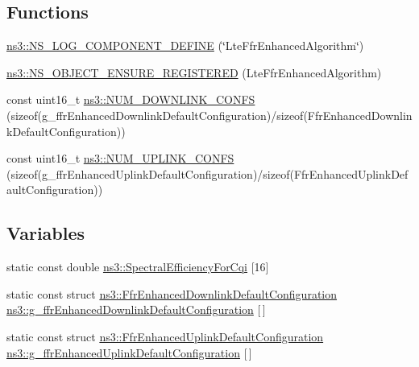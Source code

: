 \subsection*{Functions}
\begin{DoxyCompactItemize}
\item 
\hyperlink{namespacens3_a0186f2dcbc0b11c9d72410983a55bb59}{ns3\+::\+N\+S\+\_\+\+L\+O\+G\+\_\+\+C\+O\+M\+P\+O\+N\+E\+N\+T\+\_\+\+D\+E\+F\+I\+NE} (\char`\"{}Lte\+Ffr\+Enhanced\+Algorithm\char`\"{})
\item 
\hyperlink{namespacens3_a7b167836c469948d79c4d2b4accbaf0a}{ns3\+::\+N\+S\+\_\+\+O\+B\+J\+E\+C\+T\+\_\+\+E\+N\+S\+U\+R\+E\+\_\+\+R\+E\+G\+I\+S\+T\+E\+R\+ED} (Lte\+Ffr\+Enhanced\+Algorithm)
\item 
const uint16\+\_\+t \hyperlink{namespacens3_a417f8ac741bc7d3d00afe1cc14a59faf}{ns3\+::\+N\+U\+M\+\_\+\+D\+O\+W\+N\+L\+I\+N\+K\+\_\+\+C\+O\+N\+FS} (sizeof(g\+\_\+ffr\+Enhanced\+Downlink\+Default\+Configuration)/sizeof(Ffr\+Enhanced\+Downlink\+Default\+Configuration))
\item 
const uint16\+\_\+t \hyperlink{namespacens3_a5dc0a36a47c74fa76aa6f2db243f9478}{ns3\+::\+N\+U\+M\+\_\+\+U\+P\+L\+I\+N\+K\+\_\+\+C\+O\+N\+FS} (sizeof(g\+\_\+ffr\+Enhanced\+Uplink\+Default\+Configuration)/sizeof(Ffr\+Enhanced\+Uplink\+Default\+Configuration))
\end{DoxyCompactItemize}
\subsection*{Variables}
\begin{DoxyCompactItemize}
\item 
static const double \hyperlink{namespacens3_aa667d4abe6d529b6b88203fd52973c8a}{ns3\+::\+Spectral\+Efficiency\+For\+Cqi} \mbox{[}16\mbox{]}
\item 
static const struct \hyperlink{structns3_1_1FfrEnhancedDownlinkDefaultConfiguration}{ns3\+::\+Ffr\+Enhanced\+Downlink\+Default\+Configuration} \hyperlink{namespacens3_a11e7f67655b61ccec8fb43e6a25b31fc}{ns3\+::g\+\_\+ffr\+Enhanced\+Downlink\+Default\+Configuration} \mbox{[}$\,$\mbox{]}
\item 
static const struct \hyperlink{structns3_1_1FfrEnhancedUplinkDefaultConfiguration}{ns3\+::\+Ffr\+Enhanced\+Uplink\+Default\+Configuration} \hyperlink{namespacens3_a1972a7e24f610346194afdd55cb1860f}{ns3\+::g\+\_\+ffr\+Enhanced\+Uplink\+Default\+Configuration} \mbox{[}$\,$\mbox{]}
\end{DoxyCompactItemize}
